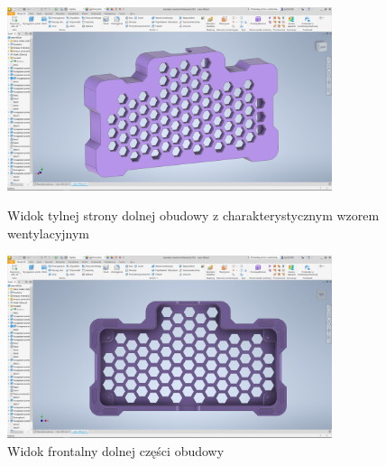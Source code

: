 \clearpage
\begin{figure}[htbp]
\centering
	\includegraphics[width=0.85\textwidth]{root/enclosure_back.png}
	\caption{Widok tylnej strony dolnej obudowy z charakterystycznym wzorem wentylacyjnym}
	\vspace{1cm}
	\includegraphics[width=0.85\textwidth]{root/enclosure_front.png}
	\caption{Widok frontalny dolnej części obudowy}
\end{figure}


